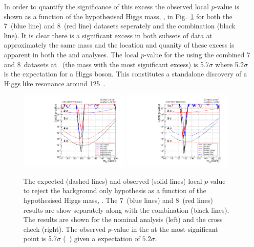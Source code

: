 In order to quantify the significance of this excess the observed local $p$-value is shown as a function of the hypothesised Higgs mass, \mH, in Fig.~\ref{fig:res_pvalue} for both the 7~\TeV (blue line) and 8~\TeV (red line) datasets seperately and the combination (black line). It is clear there is a significant excess in both subsets of data at approximately the same mass and the location and quanity of these excess is apparent in both the \MFM and \SMVA analyses. The local $p$-value for the \MFM using the combined 7 and 8~\TeV datasets at ~\GeV (the mass with the most significant excess) is 5.7$\sigma$ where 5.2$\sigma$ is the expectation for a \SM Higgs boson. This constitutes a standalone discovery of a Higgs like resonance around 125~\GeV.

\begin{figure}
  \includegraphics[width=0.49\textwidth]{ch5_anal_and_results/plots/results/obspvalue.pdf}
  \includegraphics[width=0.49\textwidth]{ch5_anal_and_results/plots/results/obspvalue_sideband.pdf}
  \caption{The expected (dashed lines) and observed (solid lines) local $p$-value to reject the background only hypothesis as a function of the hypothesised Higgs mass, \mH. The 7~\TeV (blue lines) and 8~\TeV (red lines) results are show separately along with the combination (black lines). The results are shown for the nominal \MFM analysis (left) and the cross check \SMVA (right). The observed $p$-value in the \MFM at the most significant point is 5.7$\sigma$ (~\GeV) given a \SM expectation of $5.2\sigma$. \plotupdate}
  \label{fig:res_pvalue}
\end{figure}


